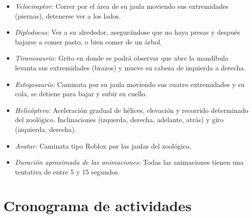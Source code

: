 \documentclass[12pt]{article} %
\begin{document}
	\begin{itemize}
		\item[\textbullet] \emph{Velociraptor:} Correr por el área de su jaula moviendo sus extremidades (piernas), detenerse ver a los lados.
		\item[\textbullet] \emph{Diplodocus:} Ver a su alrededor, asegurándose que no haya presas y después bajarse a comer pasto, 
					o bien comer de un árbol.
		\item[\textbullet] \emph{Tiranosaurio:} Grito en donde se podrá observar que abre la mandibula levanta sus extremidades (brazos) y mueve su cabeza de izquierda a derecha.
		\item[\textbullet] \emph{Estegosaurio:} Caminata por su jaula moviendo sus cuatro extremidades y su cola, se detiene para bajar y subir su cuello.
		\item[\textbullet] \emph{Helicóptero:} Aceleración gradual de hélices, elevación y recorrido determinado del zoológico. 
				Inclinaciones (izquerda, derecha, adelante, atrás) y giro (izquierda, derecha).
		\newpage
		\item[\textbullet] \emph{Avatar:} Caminata tipo Roblox por las jaulas del zoológico.
		\item[\textbullet] \emph{Duración aproximada de las animaciones:} Todas las animaciones tienen una tentativa de entre 5 y 15 segundos.
 	\end{itemize}
 	
 	\section{Cronograma de actividades}
 	
\end{document}
